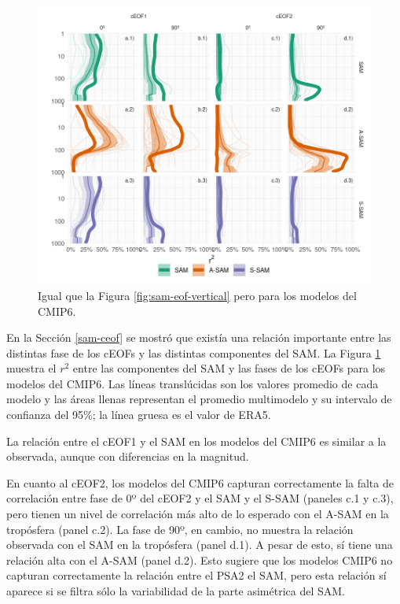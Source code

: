 \documentclass[12pt,oneside,a4paper]{reedthesis}
\begin{document}
\begin{figure}

{\centering \includegraphics{figures/50-cmip6/cor-sam-cmip6-1} 

}

\caption{Igual que la Figura \ref{fig:sam-eof-vertical} pero para los modelos del CMIP6.}\label{fig:cor-sam-cmip6}
\end{figure}



En la Sección \ref{sam-ceof} se mostró que existía una relación importante entre las distintas fase de los cEOFs y las distintas componentes del SAM.
La Figura \ref{fig:cor-sam-cmip6} muestra el \(r^2\) entre las componentes del SAM y las fases de los cEOFs para los modelos del CMIP6.
Las líneas translúcidas son los valores promedio de cada modelo y las áreas llenas representan el promedio multimodelo y su intervalo de confianza del 95\%; la línea gruesa es el valor de ERA5.

La relación entre el cEOF1 y el SAM en los modelos del CMIP6 es similar a la observada, aunque con diferencias en la magnitud.

En cuanto al cEOF2, los modelos del CMIP6 capturan correctamente la falta de correlación entre fase de 0º del cEOF2 y el SAM y el S-SAM (paneles c.1 y c.3), pero tienen un nivel de correlación más alto de lo esperado con el A-SAM en la tropósfera (panel c.2).
La fase de 90º, en cambio, no muestra la relación observada con el SAM en la tropósfera (panel d.1).
A pesar de esto, sí tiene una relación alta con el A-SAM (panel d.2).
Esto sugiere que los modelos CMIP6 no capturan correctamente la relación entre el PSA2 el SAM, pero esta relación sí aparece si se filtra sólo la variabilidad de la parte asimétrica del SAM.
\end{document}
